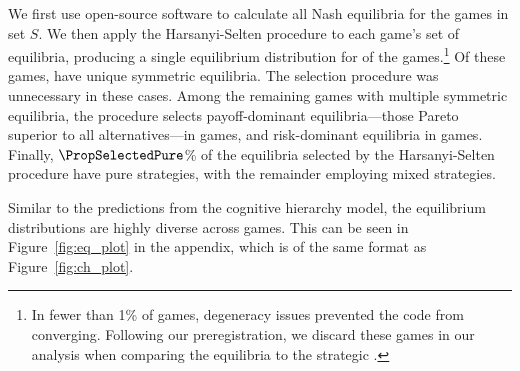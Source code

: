 We first use open-source software \citep{gambit2025} to calculate all Nash equilibria for the \NGamesS{} games in set $S$. 
We then apply the Harsanyi-Selten procedure to each game's set of equilibria, producing a single equilibrium distribution for \GamesConverged{} of the games.\footnote{
In fewer than 1\% of games, degeneracy issues prevented the code from converging.
Following our preregistration, we discard these games in our analysis when comparing the equilibria to the strategic .}
Of these \GamesConverged{} games, \CountUniqueEq{} have unique symmetric equilibria.
The selection procedure was unnecessary in these cases. 
Among the remaining games with multiple symmetric equilibria, the procedure selects payoff-dominant equilibria---those Pareto superior to all alternatives---in \CountPayoffDomEq{} games, and risk-dominant equilibria in \CountRiskDomEq{} games. 
Finally, $\PropSelectedPure$\% of the equilibria selected by the Harsanyi-Selten procedure have pure strategies, with the remainder employing mixed strategies.

Similar to the predictions from the cognitive hierarchy model, the equilibrium distributions are highly diverse across games.
This can be seen in Figure~\ref{fig:eq_plot} in the appendix, which is of the same format as Figure~\ref{fig:ch_plot}.
